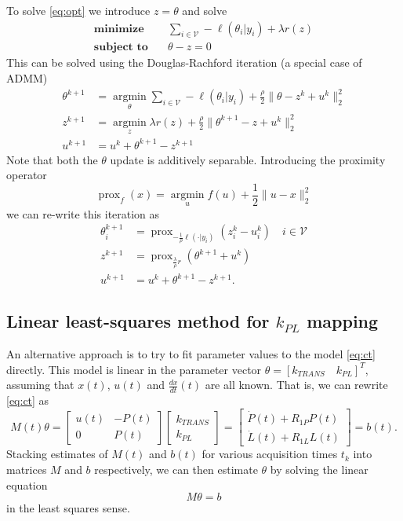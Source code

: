 \documentclass{article}
\newcommand{\argmin}{\operatorname*{argmin}}
\newcommand{\prox}{\operatorname{prox}}
\begin{document}
To solve \ref{eq:opt} we introduce $z = \theta$ and solve
\begin{equation}
\begin{split}
\textbf{minimize} & \quad  \sum_{i \in \mathcal{V}} -\ell(\theta_i | y_i) + \lambda r(z) \\
\textbf{subject to} & \quad \theta - z = 0
\end{split} 
\end{equation} 
This can be solved using the Douglas-Rachford iteration (a special case of ADMM) 
\[
\begin{split} 
\theta^{k+1} &= \argmin_\theta  \sum_{i \in \mathcal{V}} -\ell(\theta_i | y_i) + \frac{\rho}{2} \|\theta - z^k + u^k \|_2^2 \\
z^{k+1} &= \argmin_z \lambda r(z) + \frac{\rho}{2} \| \theta^{k+1} - z + u^k \|_2^2 \\
u^{k+1} &= u^k + \theta^{k+1} - z^{k+1}
\end{split} 
\]
Note that both the $\theta$ update is additively separable. Introducing the proximity operator
\[
\prox_f(x) = \argmin_u f(u) + \frac{1}{2} \|u - x\|_2^2 
\]
we can re-write this iteration as 
\[
\begin{split} 
\theta_i^{k+1} &= \prox_{-\frac{1}{\rho} \ell(\cdot | y_i)} (z_i^k - u_i^k) \quad i \in \mathcal{V} \\
z^{k+1} &= \prox_{\frac{\lambda}{\rho} r} (\theta^{k+1} + u^k) \\
u^{k+1} &= u^k + \theta^{k+1} - z^{k+1}. 
\end{split} 
\]

\subsection{Linear least-squares method for $k_{PL}$ mapping} 

An alternative approach is to try to fit parameter values to the model \eqref{eq:ct} directly. This model is linear in the parameter vector $\theta = [k_{TRANS} \quad k_{PL}]^T$, assuming that $x(t)$, $u(t)$ and $\frac{dx}{dt}(t)$ are all known. That is, we can rewrite \eqref{eq:ct} as 
\[
M(t) \theta = \left[\begin{array}{rr} u(t) & -P(t) \\ 0 & P(t) \end{array}\right] \left[\begin{array}{c} k_{TRANS} \\ k_{PL} \end{array}\right] = \left[\begin{array}{c} \dot P(t) + R_{1P}P(t) \\ \dot L(t) + R_{1L}L(t)\end{array}\right] = b(t).  
\]
Stacking estimates of $M(t)$ and $b(t)$ for various acquisition times $t_k$ into matrices $M$ and $b$ respectively, we can then estimate $\theta$ by solving the linear equation
\begin{equation}
M \theta = b
\end{equation} 
in the least squares sense. 
\end{document}
